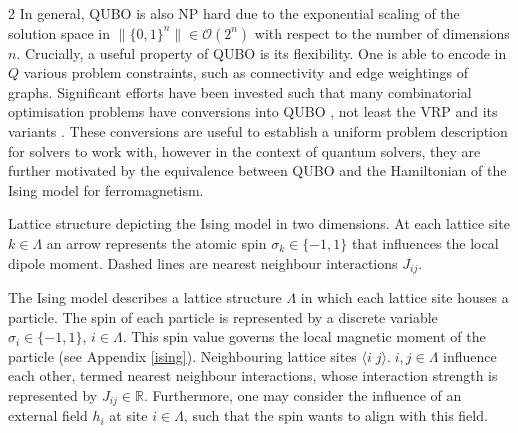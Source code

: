 \documentclass [10pt]{article}
\newcommand {\qeval}[1] {\langle #1 \rangle}
\newcommand {\qnorm}[1] {\lVert #1 \rVert}
\begin{document}
\begin {multicols}{2}
In general, QUBO is also NP hard due to the exponential scaling of the
solution space in $\qnorm{\{0, 1\}^n} \in \mathcal{O}(2^n)$ with respect
to the number of dimensions $n$. Crucially, a useful property of QUBO is its
flexibility. One is able to encode in $Q$ various problem constraints, such
as connectivity and edge weightings of graphs. Significant efforts have been
invested such that many combinatorial optimisation problems have conversions
into QUBO \cite{isingnp} \cite{tutqubo},
not least the VRP and its variants \cite {qubolist}. These conversions
are useful to establish a uniform problem description for solvers to work with,
however in the context of quantum solvers, they are further motivated by the 
equivalence between QUBO and the Hamiltonian of the Ising model for
ferromagnetism.

\vspace {0.3cm}
\begin {center}

	{
	Lattice structure depicting the Ising model in two dimensions. At each
	lattice site $k \in \Lambda$ an arrow represents the atomic spin
	$\sigma_k \in \{-1, 1\}$ that influences the local dipole moment. Dashed
	lines are nearest neighbour interactions $J_{ij}$.
}
\end {center}
\vspace {0.3cm}

The Ising model describes a lattice structure $\Lambda$ in which each lattice
site houses a particle. The spin of each particle is represented by a discrete
variable $\sigma_i \in \{-1, 1\}$, $i \in \Lambda$. This spin value governs the
local magnetic moment of the particle (see Appendix \ref{ising}).
Neighbouring lattice sites $\qeval{i\;j}. \; i, j \in \Lambda$ influence each
other, termed nearest neighbour interactions, whose interaction strength is
represented by $J_{ij} \in \mathbb R$. Furthermore, one may consider the
influence of an external field $h_i$ at site $i \in \Lambda$, such that the
spin wants to align with this field. \cite{isingmodel}


\end{multicols}
\end{document}
